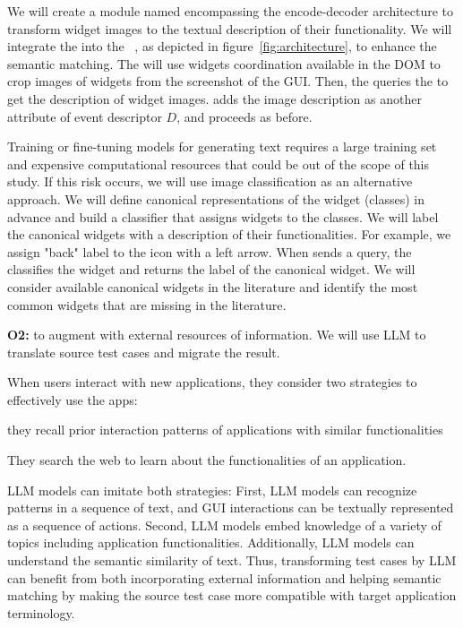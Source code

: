 \smallskip
We will create a module named \imagelabeler encompassing the encode-decoder architecture to transform widget images to the textual description of their functionality.
We will integrate the \imagelabeler into the \testreuse~\architecture, as depicted in figure~\ref{fig:architecture}, to enhance the semantic matching.
The \ede  will use widgets coordination available in the DOM to crop images of widgets from the screenshot of the GUI.
Then, the \ede queries the \imagelabeler to get the description of  widget images.
\ede adds the image description as another attribute of event descriptor $D$, and \matcher proceeds as before.


\smallskip
Training or fine-tuning models for generating text requires a large training set and expensive computational resources that could be out of the scope of this study. 
If this risk occurs, we will use image classification as an alternative approach.
We will define canonical representations of the widget  (classes) in advance and build a classifier that assigns widgets to the classes.
We will label the canonical widgets with a description of their functionalities.
For example, we assign "back" label to the icon with a left arrow.
When \ede sends a query, the \imagelabeler classifies the widget and returns the label of the canonical widget.
We will consider available canonical widgets in the literature and identify the most common widgets that are missing in the literature. 




\bigskip 
\noindent
\textbf{O2:} to augment \testreuse with external resources of information.
We will use LLM to translate source test cases and migrate the result.

\smallskip
When users interact with new applications, they consider two strategies to effectively use the apps:
\begin{inparaenum}[a)]
\item they recall prior  interaction patterns of  applications with similar functionalities
\item They search the web to learn about the functionalities of an application.
\end{inparaenum}
LLM models can imitate both strategies:
First, LLM models can recognize patterns in a sequence of text, and GUI interactions can be textually represented as a sequence of actions. 
Second, LLM models embed knowledge of a variety of topics including application functionalities.
Additionally, LLM models can understand the semantic similarity of text. 
Thus, transforming test cases by LLM can benefit from both incorporating external information and helping semantic matching by making the source test case more compatible with target application terminology.



